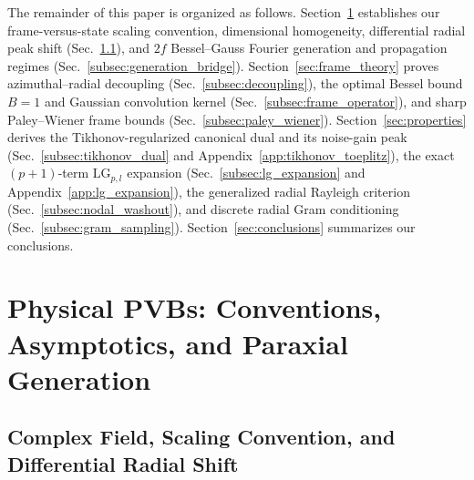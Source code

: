 \documentclass[aps,pra,reprint,nofootinbib,floatfix,longbibliography]{revtex4-2}
\theoremstyle{remark}
\begin{document}
The remainder of this paper is organized as follows. Section~\ref{sec:pvb_formation} establishes our frame-versus-state scaling convention, dimensional homogeneity, differential radial peak shift (Sec.~\ref{subsec:pvb_def}), and $2f$ Bessel--Gauss Fourier generation and propagation regimes (Sec.~\ref{subsec:generation_bridge}). Section~\ref{sec:frame_theory} proves azimuthal--radial decoupling (Sec.~\ref{subsec:decoupling}), the optimal Bessel bound $B = 1$ and Gaussian convolution kernel (Sec.~\ref{subsec:frame_operator}), and sharp Paley--Wiener frame bounds (Sec.~\ref{subsec:paley_wiener}). Section~\ref{sec:properties} derives the Tikhonov-regularized canonical dual and its noise-gain peak (Sec.~\ref{subsec:tikhonov_dual} and Appendix~\ref{app:tikhonov_toeplitz}), the exact $(p+1)$-term $\mathrm{LG}_{p,l}$ expansion (Sec.~\ref{subsec:lg_expansion} and Appendix~\ref{app:lg_expansion}), the generalized radial Rayleigh criterion (Sec.~\ref{subsec:nodal_washout}), and discrete radial Gram conditioning (Sec.~\ref{subsec:gram_sampling}). Section~\ref{sec:conclusions} summarizes our conclusions.

\section{Physical PVBs: Conventions, Asymptotics, and Paraxial Generation}
\label{sec:pvb_formation}

\subsection{Complex Field, Scaling Convention, and Differential Radial Shift}
\label{subsec:pvb_def}
\end{document}
